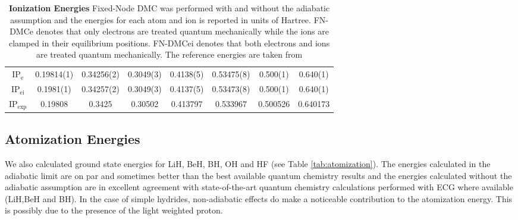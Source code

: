 \documentclass[aps,prl,superscriptaddress,groupedaddress]{revtex4}
\begin{document}
\begin{table*}[htpb!]
\begin{tabular}{*{1}{*{8}{c}}}
\hline
$\text{IP}_{\text{e}}$  & 0.19814(1) & 0.34256(2) & 0.3049(3) & 0.4138(5) & 0.53475(8) & 0.500(1) & 0.640(1) \\
$\text{IP}_{\text{ei}}$ & 0.1981(1) & 0.34257(2) & 0.3049(3) & 0.4137(5) & 0.53473(8) & 0.500(1) & 0.640(1) \\
$\text{IP}_{\text{exp}}$ & 0.19808 & 0.3425 & 0.30502 & 0.413797 & 0.533967 & 0.500526 & 0.640173 \\
\hline
\end{tabular}
\caption{\textbf{Ionization Energies} Fixed-Node DMC was performed with and without the adiabatic assumption and the energies for each atom and ion is reported in units of Hartree. FN-DMCe denotes that only electrons are treated quantum mechanically while the ions are clamped in their equilibrium positions. FN-DMCei denotes that both electrons and ions are treated quantum mechanically. The reference energies are taken from \cite{Seth_Bench} \label{tab:ionization}}
\end{table*}
 
\subsection{Atomization Energies}
We also calculated ground state energies for LiH, BeH, BH, OH and HF (see Table \ref{tab:atomization}). The energies calculated in the adiabatic limit are on par and sometimes better than the best available quantum chemistry results \cite{Adamowicz_LiH,Koput_BeH,Miliordos_BH} and the energies calculated without the adiabatic assumption are in excellent agreement with state-of-the-art quantum chemistry calculations performed with ECG where available (LiH,BeH and BH). In the case of simple hydrides, non-adiabatic effects do make a noticeable contribution to the atomization energy. This is possibly due to the presence of the light weighted proton.
 
\end{document}
